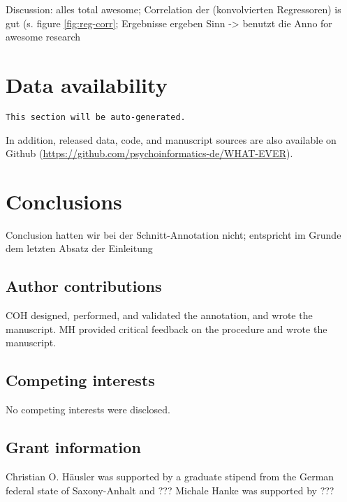 \documentclass[10pt,a4paper,onecolumn]{article}
\begin{document}
Discussion: alles total awesome; Correlation der (konvolvierten Regressoren) is gut (s. figure \ref{fig:reg-corr}; Ergebnisse ergeben Sinn -> benutzt die Anno for awesome research

\section*{Data availability}
\texttt{This section will be auto-generated.}

In addition, released data, code, and manuscript sources are also available on
Github (\url{https://github.com/psychoinformatics-de/WHAT-EVER}).

\section*{Conclusions}
Conclusion hatten wir bei der Schnitt-Annotation nicht; entspricht im Grunde dem letzten Absatz der Einleitung


\subsection*{Author contributions}
COH designed, performed, and validated the annotation, and wrote the manuscript.
MH provided critical feedback on the procedure and wrote the manuscript.

\subsection*{Competing interests}
No competing interests were disclosed.

\subsection*{Grant information}
Christian O. Häusler was supported by a graduate stipend from the German federal state of Saxony-Anhalt and ???
Michale Hanke was supported by ???
\end{document}
